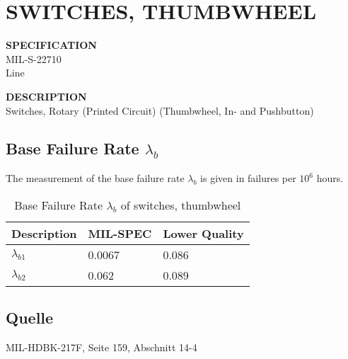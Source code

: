 \section{SWITCHES, THUMBWHEEL}

\begin{minipage}[t]{0.29\textwidth}
    \textbf{SPECIFICATION}\\
    MIL-S-22710\\Line
\end{minipage}
\begin{minipage}[t]{0.7\textwidth}
    \textbf{DESCRIPTION}\\
    Switches, Rotary (Printed Circuit) (Thumbwheel, In- and Pushbutton)
\end{minipage}

\subsection{Base Failure Rate $\lambda_b$}
The measurement of the base failure rate $\lambda_b$ is given in failures per $10^6$ hours.
\begin{table}[ht]
{\centering

\begin{tabular}{|p{3cm}|p{3cm}|p{3cm}|}
    \hline
    \textbf{Description} & \textbf{MIL-SPEC} & \textbf{Lower Quality} \\
    \hline
    $\lambda_{b1}$ & 0.0067 & 0.086 \\
    \hline
    $\lambda_{b2}$ & 0.062 & 0.089 \\
    \hline
\end{tabular}

\caption{Base Failure Rate $\lambda_b$ of switches, thumbwheel}

\label{tab:bfr_switches_thumbwheel}
\par}
\end{table}
\subsection*{Quelle}
MIL-HDBK-217F, Seite 159, Abschnitt 14-4